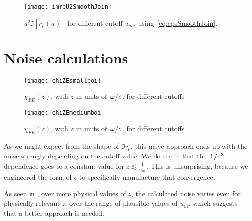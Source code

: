 \documentclass[11pt]{article}
\begin{document}
	\begin{figure}[htp]
		\centering
		\texttt{[image: imrpU2SmoothJoin]}
		\caption{$u^2 \Im[r_p(u)]$ for different cutoff $u_{uc}$, using~\eqref{eq:epsSmoothJoin}.} \label{fig:u2imrpVsCutoffSmoothJoin}
	\end{figure}

	\section{Noise calculations} \label{sec:noise}
	\begin{figure}[htp]
		\centering
		\texttt{[image: chiZEsmallboi]}
		\caption{$\chi_{EE}(z)$, with $z$ in units of $\flatfrac{\omega}{c}$, for different cutoffs} \label{fig:chiZRange}
	\end{figure}
	\begin{figure}[htp]
		\centering
		\texttt{[image: chiZEmediumboi]}
		\caption{$\chi_{EE}(z)$, with $z$ in units of $\flatfrac{\omega}{c}$, for different cutoffs} \label{fig:chiZMedium}
	\end{figure}
	As we might expect from the shape of $\Im r_p$, this naive approach ends up with the noise strongly depending on the cutoff value.
	We do see in  that the $\flatfrac{1}{z^3}$ dependence goes to a constant value for $z \lesssim \frac{1}{u_{uc}}$.
	This is unsurprising, because we engineered the form of $\epsilon$ to specifically manufacture that convergence.

	As seen in , over more physical values of $z$, the calculated noise varies even for physically relevant $z$, over the range of plausible values of $u_{uc}$, which suggests that a better approach is needed.

	\newpage
	\listoftodos
	\newpage
	\printbibliography
\end{document}
